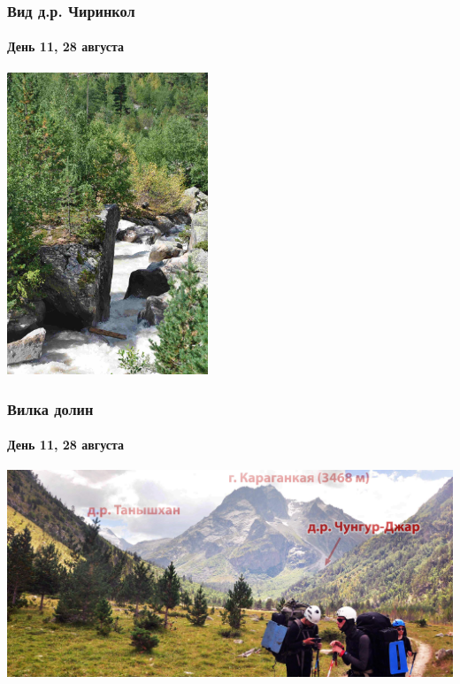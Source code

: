 \begin{frame}
	\frametitle{Вид д.р. Чиринкол}
	\framesubtitle{День 11, 28 августа}	
	\centering
	\includegraphics[width=0.45\textwidth]{../pics/DSC_0460 2}			
\end{frame}

\begin{frame}
	\frametitle{Вилка долин}
	\framesubtitle{День 11, 28 августа}	
	\centering
	\includegraphics[width=\textwidth]{../pics/DSC_0462 2}			
\end{frame}
